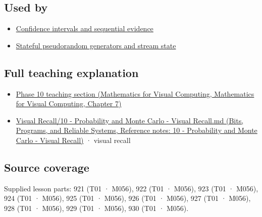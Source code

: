 \subsection{Used by}\label{appendix-a2360b435383-used-by}

\begin{itemize}
\tightlist
\item
  \hyperref[appendix-c83016554b1e]{Confidence intervals and sequential evidence}
\item
  \hyperref[appendix-e0f7c7e08f3a]{Stateful pseudorandom generators and stream state}
\end{itemize}

\subsection{Full teaching explanation}\label{appendix-a2360b435383-full-teaching-explanation}

\begin{itemize}
\tightlist
\item
  \href{../02-Mathematics-for-Visual-Computing/main.pdf\#nameddest=02-foundations-ii-ch023-discrete-and-continuous-distribution-families}{Phase 10 teaching section (Mathematics for Visual Computing, Mathematics for Visual Computing, Chapter 7)}
\item
  \href{../01-Bits-Programs-and-Reliable-Systems/main.pdf\#nameddest=appendix-cb5af353ef77}{Visual Recall/10 - Probability and Monte Carlo - Visual Recall.md (Bits, Programs, and Reliable Systems, Reference notes: 10 - Probability and Monte Carlo - Visual Recall)} · visual recall
\end{itemize}

\subsection{Source coverage}\label{appendix-a2360b435383-source-coverage}

Supplied lesson parts: 921 (T01 · M056), 922 (T01 · M056), 923 (T01 · M056), 924 (T01 · M056), 925 (T01 · M056), 926 (T01 · M056), 927 (T01 · M056), 928 (T01 · M056), 929 (T01 · M056), 930 (T01 · M056).
